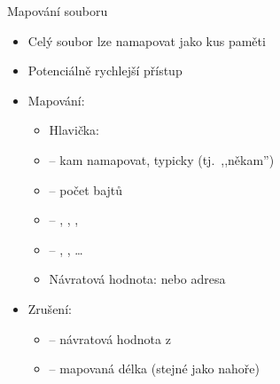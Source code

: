 \begin{frame}{Mapování souboru}

  \begin{itemize}
    \item Celý soubor lze namapovat jako kus paměti
    \item Potenciálně rychlejší přístup

    \pause

    \item Mapování:  \\
    \begin{itemize}
      \item Hlavička: 
      \item {} -- kam namapovat, typicky  (tj.\ ,,někam'')
      \item {} -- počet bajtů
      \item {} -- , ,
        , 
      \item {} -- , , \dots
      \item Návratová hodnota:  nebo adresa
    \end{itemize}

    \pause

    \item Zrušení: 
    \begin{itemize}
      \item {} -- návratová hodnota z 
      \item {} -- mapovaná délka (stejné jako nahoře)
    \end{itemize}
  \end{itemize}

\end{frame}

